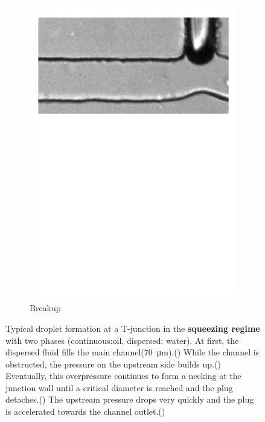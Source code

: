 \begin{figure}[h!]
\begin{subfigure}{0.24\linewidth}
		\includegraphics[page=13,clip,trim={10mm 190mm 00mm 20mm},width=\linewidth]{Ressourcen/PinchOff/Squeezing}
		\caption{Breakup}
		\label{fig:fluidics:droplet:squeezing:breakup}
	\end{subfigure}
	
	\caption{Typical droplet formation at a T-junction in the \textbf{squeezing regime} with two phases (continuous:oil, dispersed: water). At first, the dispersed fluid fills the main channel(\SI{70}{\micro\meter}).(\protect{}) While the channel is obstructed, the pressure on the upstream side builds up.(\protect{}) Eventually, this overpressure continues to form a necking at the junction wall until a critical diameter is reached and the plug detaches.(\protect {}) The upstream pressure drops very quickly and the plug is accelerated towards the channel outlet.(\protect{})}
	\label{fig:fluidics:droplet:squeezing}
\end{figure}

